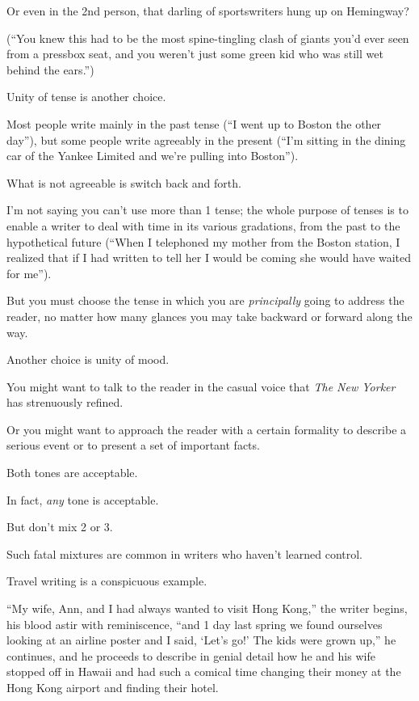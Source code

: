 \documentclass{book}
\numberwithin{equation}{section}
\begin{document}
Or even in the 2nd person, that darling of sportswriters hung up on Hemingway?

(``You knew this had to be the most spine-tingling clash of giants you'd ever seen from a pressbox seat, and you weren't just some green kid who was still wet behind the ears.'')

%
Unity of tense is another choice.

Most people write mainly in the past tense (``I went up to Boston the other day''), but some people write agreeably in the present (``I'm sitting in the dining car of the Yankee Limited and we're pulling into Boston'').

What is not agreeable is switch back and forth.

I'm not saying you can't use more than 1 tense; the whole purpose of tenses is to enable a writer to deal with time in its various gradations, from the past to the hypothetical future (``When I telephoned my mother from the Boston station, I realized that if I had written to tell her I would be coming she would have waited for me'').

But you must choose the tense in which you are \textit{principally} going to address the reader, no matter how many glances you may take backward or forward along the way.

%
Another choice is unity of mood.

You might want to talk to the reader in the casual voice that \textit{The New Yorker} has strenuously refined.

Or you might want to approach the reader with a certain formality to describe a serious event or to present a set of important facts.

Both tones are acceptable.

In fact, \textit{any} tone is acceptable.

But don't mix 2 or 3.

%
Such fatal mixtures are common in writers who haven't learned control.

Travel writing is a conspicuous example.

``My wife, Ann, and I had always wanted to visit Hong Kong,'' the writer begins, his blood astir with reminiscence, ``and 1 day last spring we found ourselves looking at an airline poster and I said, `Let's go!' The kids were grown up,'' he continues, and he proceeds to describe in genial detail how he and his wife stopped off in Hawaii and had such a comical time changing their money at the Hong Kong airport and finding their hotel.
\end{document}
